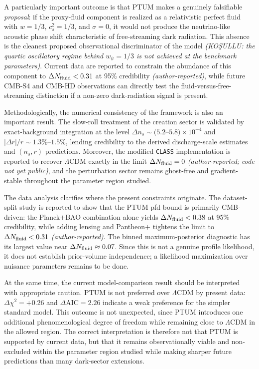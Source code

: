 \documentclass[epj]{svjour}
\begin{document}
A particularly important outcome is that PTUM makes a genuinely
falsifiable \emph{proposal}: if the proxy-fluid component is realized
as a relativistic perfect fluid with
$w=1/3$, $c_s^2=1/3$, and $\sigma=0$, it would not
produce the neutrino-like acoustic phase shift characteristic of
free-streaming dark radiation. This absence is the cleanest proposed observational discriminator
of the model \emph{(KOŞULLU: the quartic oscillatory regime behind
$w_\psi=1/3$ is not achieved at the benchmark parameters)}. Current
data are reported to constrain the abundance of this
component to $\Delta N_{\rm fluid}<0.31$ at 95\% credibility
\emph{(author-reported)}, while future CMB-S4 and CMB-HD observations
can directly test the fluid-versus-free-streaming distinction if a
non-zero dark-radiation signal is present.

Methodologically, the numerical consistency of the framework is also
an important result. The slow-roll treatment of the creation sector
is validated by exact-background integration at the level
$\Delta n_s\sim(5.2$--$5.8)\times10^{-4}$ and
$|\Delta r|/r\sim1.3\%$--$1.5\%$, lending credibility to the
derived discharge-scale estimates and $(n_s,r)$ predictions.
Moreover, the modified \texttt{CLASS} implementation is reported to
recover $\Lambda$CDM exactly in the limit $\Delta N_{\rm fluid}=0$
\emph{(author-reported; code not yet public)}, and the perturbation
sector remains ghost-free and gradient-stable throughout the
parameter region studied.

The data analysis clarifies where the present constraints originate.
The dataset-split study is reported to show that the PTUM pfd bound is primarily
CMB-driven: the Planck$+$BAO combination alone yields
$\Delta N_{\rm fluid}<0.38$ at 95\% credibility, while adding
lensing and Pantheon$+$ tightens the limit to
$\Delta N_{\rm fluid}<0.31$ \emph{(author-reported)}. The binned maximum-posterior diagnostic has its largest value near
$\Delta N_{\rm fluid}\approx0.07$. Since this is not a genuine
profile likelihood, it does not establish prior-volume independence;
a likelihood maximization over nuisance parameters remains to be done.

At the same time, the current model-comparison result should be
interpreted with appropriate caution. PTUM is not preferred over
$\Lambda$CDM by present data:
$\Delta\chi^2=+0.26$ and $\Delta\mathrm{AIC}=2.26$ indicate a
weak preference for the simpler standard model. This outcome is not
unexpected, since PTUM introduces one additional phenomenological
degree of freedom while remaining close to $\Lambda$CDM in the
allowed region. The correct interpretation is therefore not that
PTUM is supported by current data, but that it remains observationally viable
and non-excluded within the parameter region studied while making sharper future
predictions than many dark-sector extensions.
\end{document}
